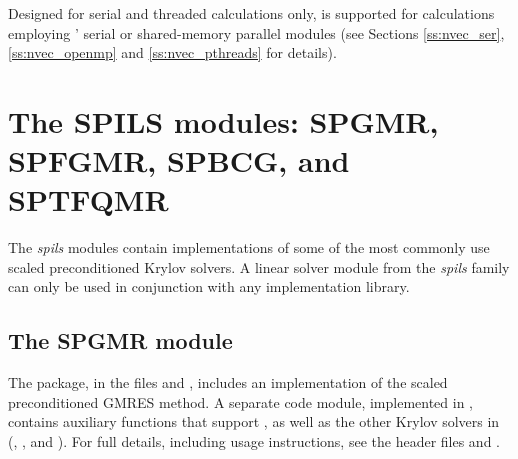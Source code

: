 Designed for serial and threaded calculations only, {\superlumt} is
supported for calculations employing {\sundials}' serial or shared-memory
parallel {\nvector} modules (see Sections \ref{ss:nvec_ser}, \ref{ss:nvec_openmp}
and \ref{ss:nvec_pthreads} for details).






\section{The SPILS modules: SPGMR, SPFGMR, SPBCG, and SPTFQMR}\label{s:spils}

The {\em spils} modules contain implementations of some of the most commonly
use scaled preconditioned Krylov solvers.
A linear solver module from the {\em spils} family can only be used 
in conjunction with any {\nvector} implementation library.

\subsection{The SPGMR module}\label{ss:spgmr}

The {\spgmr} package, in the files  and
, includes an implementation of the scaled
preconditioned GMRES method.  A separate code
module, implemented in , contains
auxiliary functions that support {\spgmr}, as well as the other Krylov
solvers in {\sundials} ({\spfgmr}, {\spbcg}, and {\sptfqmr}).
For full details, including usage instructions, see the header
files  and .

